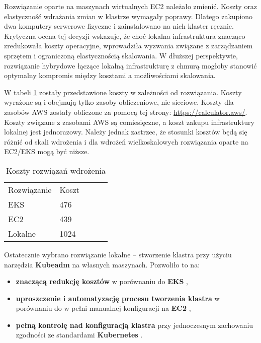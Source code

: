 \newpage

Rozwiązanie oparte na maszynach wirtualnych EC2 należało zmienić. Koszty oraz elastyczność wdrażania zmian w klastrze wymagały poprawy. Dlatego zakupiono dwa komputery serwerowe fizyczne i zainstalowano na nich klaster ręcznie. Krytyczna ocena tej decyzji wskazuje, że choć lokalna infrastruktura znacząco zredukowała koszty operacyjne, wprowadziła wyzwania związane z zarządzaniem sprzętem i ograniczoną elastycznością skalowania. W dłuższej perspektywie, rozwiązanie hybrydowe łączące lokalną infrastrukturę z chmurą mogłoby stanowić optymalny kompromis między kosztami a możliwościami skalowania.

W tabeli \ref{tab:koszty_rozwiazan_wdrazenia} zostały przedstawione koszty w zależności od rozwiązania. Koszty wyrażone są i obejmują tylko zasoby obliczeniowe, nie sieciowe. Koszty dla zasobów AWS zostały obliczone za pomocą tej strony: \url{https://calculator.aws/}. Koszty związane z zasobami AWS są comiesięczne, a koszt zakupu infrastruktury lokalnej jest jednorazowy. Należy jednak zastrzec, że stosunki kosztów będą się różnić od skali wdrożenia i dla wdrożeń wielkoskalowych rozwiązania oparte na EC2/EKS mogą być niższe.

\begin{table}[h]
    \centering
    \begin{tabular}{|l|l|lll}
    \cline{1-2}
    Rozwiązanie & Koszt &  &  &  \\ \cline{1-2}
    EKS         & 476   &  &  &  \\ \cline{1-2}
    EC2         & 439   &  &  &  \\ \cline{1-2}
    Lokalne     & 1024  &  &  &  \\ \cline{1-2}
    \end{tabular}
    \caption{Koszty rozwiązań wdrożenia}
    \label{tab:koszty_rozwiazan_wdrazenia}
\end{table}

\vspace{0.3em}

Ostatecznie wybrano rozwiązanie lokalne – stworzenie klastra przy użyciu narzędzia \textbf{Kubeadm} \cite{kubeadm_docs} na własnych maszynach. Pozwoliło to na:
\begin{itemize}
    \item \textbf{znaczącą redukcję kosztów} w porównaniu do \textbf{EKS} \cite{eks_docs},
    \item \textbf{uproszczenie i automatyzację procesu tworzenia klastra} w porównaniu do w pełni manualnej konfiguracji na \textbf{EC2} \cite{ec2_docs},
    \item \textbf{pełną kontrolę nad konfiguracją klastra} przy jednoczesnym zachowaniu zgodności ze standardami \textbf{Kubernetes} \cite{kubernetes}.
\end{itemize}

